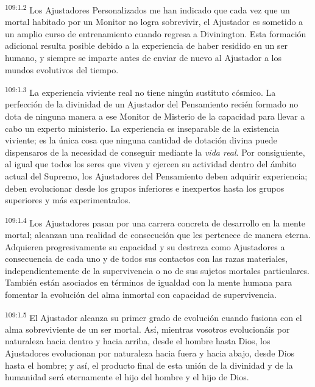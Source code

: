 \documentclass[twoside, 11pt]{book}
\begin{document}
\par
\textsuperscript{109:1.2} Los Ajustadores Personalizados me han indicado que cada vez que un mortal habitado por un Monitor no logra sobrevivir, el Ajustador es sometido a un amplio curso de entrenamiento cuando regresa a Divinington. Esta formación adicional resulta posible debido a la experiencia de haber residido en un ser humano, y siempre se imparte antes de enviar de nuevo al Ajustador a los mundos evolutivos del tiempo.

\par
\textsuperscript{109:1.3} La experiencia viviente real no tiene ningún sustituto cósmico. La perfección de la divinidad de un Ajustador del Pensamiento recién formado no dota de ninguna manera a ese Monitor de Misterio de la capacidad para llevar a cabo un experto ministerio. La experiencia es inseparable de la existencia viviente; es la única cosa que ninguna cantidad de dotación divina puede dispensaros de la necesidad de conseguir mediante la \textit{vida real}. Por consiguiente, al igual que todos los seres que viven y ejercen su actividad dentro del ámbito actual del Supremo, los Ajustadores del Pensamiento deben adquirir experiencia; deben evolucionar desde los grupos inferiores e inexpertos hasta los grupos superiores y más experimentados.

\par
\textsuperscript{109:1.4} Los Ajustadores pasan por una carrera concreta de desarrollo en la mente mortal; alcanzan una realidad de consecución que les pertenece de manera eterna. Adquieren progresivamente su capacidad y su destreza como Ajustadores a consecuencia de cada uno y de todos sus contactos con las razas materiales, independientemente de la supervivencia o no de sus sujetos mortales particulares. También están asociados en términos de igualdad con la mente humana para fomentar la evolución del alma inmortal con capacidad de supervivencia.

\par
\textsuperscript{109:1.5} El Ajustador alcanza su primer grado de evolución cuando fusiona con el alma sobreviviente de un ser mortal. Así, mientras vosotros evolucionáis por naturaleza hacia dentro y hacia arriba, desde el hombre hasta Dios, los Ajustadores evolucionan por naturaleza hacia fuera y hacia abajo, desde Dios hasta el hombre; y así, el producto final de esta unión de la divinidad y de la humanidad será eternamente el hijo del hombre y el hijo de Dios.
\end{document}
